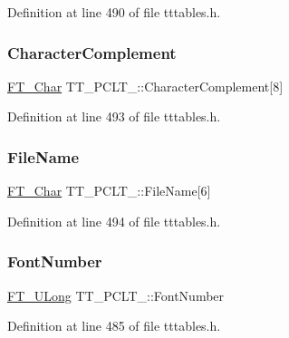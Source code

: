 Definition at line 490 of file tttables.\+h.

\mbox{\label{struct_t_t___p_c_l_t___a2641686beb550bcf8d9e598336f0acd9}} 
\subsubsection{\texorpdfstring{CharacterComplement}{CharacterComplement}}
{\footnotesize\ttfamily \mbox{\hyperlink{fttypes_8h_a0f851552b050883885f0a0855771f39d}{F\+T\+\_\+\+Char}} T\+T\+\_\+\+P\+C\+L\+T\+\_\+\+::\+Character\+Complement\mbox{[}8\mbox{]}}



Definition at line 493 of file tttables.\+h.

\mbox{\label{struct_t_t___p_c_l_t___a87691bde7cb06e3043f5320c8223e768}} 
\subsubsection{\texorpdfstring{FileName}{FileName}}
{\footnotesize\ttfamily \mbox{\hyperlink{fttypes_8h_a0f851552b050883885f0a0855771f39d}{F\+T\+\_\+\+Char}} T\+T\+\_\+\+P\+C\+L\+T\+\_\+\+::\+File\+Name\mbox{[}6\mbox{]}}



Definition at line 494 of file tttables.\+h.

\mbox{\label{struct_t_t___p_c_l_t___a1465aa1ea82df2be913eb64498fe3d94}} 
\subsubsection{\texorpdfstring{FontNumber}{FontNumber}}
{\footnotesize\ttfamily \mbox{\hyperlink{fttypes_8h_a4fac88bdba78eb76b505efa6e4fbf3f5}{F\+T\+\_\+\+U\+Long}} T\+T\+\_\+\+P\+C\+L\+T\+\_\+\+::\+Font\+Number}



Definition at line 485 of file tttables.\+h.

\mbox{\label{struct_t_t___p_c_l_t___ae8134f929d7a259c081fe28e9b5cf53d}} 
